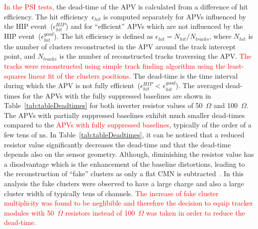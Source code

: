 \textcolor{red}{In the PSI tests,} the dead-time of the APV is calculated from a difference of hit efficiency. The hit efficiency~$\epsilon_{hit}$ is computed separately for APVs influenced by the HIP event~($\epsilon_{hit}^{HIP}$) and for ``efficient'' APVs which are not influenced by the HIP event~($\epsilon_{hit}^{good}$). The hit efficiency is defined as $\epsilon_{hit} = N_{hit}/N_{tracks}$, where $N_{hit}$ is the number of clusters reconstructed in the APV around the track intercept point, and $N_{tracks}$ is the number of reconstructed tracks traversing the APV. \textcolor{red}{The tracks were renonstructed using simple track finding algorithm using the least-squares linear fit of the clusters positions. } The dead-time is the time interval during which the APV is not fully efficient~($\epsilon_{hit}^{HIP}$ < $\epsilon_{hit}^{good}$). The averaged dead-times for the APVs with the fully suppressed baselines are shown in Table~\ref{tab:tableDeadtimes} for both inverter resistor values of 50~$\Omega$ and 100~$\Omega$. The APVs with partially suppressed baselines exhibit much smaller dead-times compared to the \textcolor{red}{APVs with fully suppressed baselines}, typically of the order of a few tens of ns. In Table~\ref{tab:tableDeadtimes}, it can be noticed that a reduced resistor value significantly decreases the dead-time and that the dead-time depends also on the sensor geometry. Although, diminishing the resistor value has a disadvantage which is the enhancement of the baseline distortions, leading to the reconstruction of ``fake'' clusters as only a flat CMN is subtracted~\cite{Bainbridge:2004jc}. In this analysis the fake clusters were observed to have a large charge and also a large cluster width of typically tens of channels. \textcolor{red}{The increase of fake cluster multiplicity was found to be neglibible and therefore the decision to equip tracker modules with 50~$\Omega$ resistors instead of 100~$\Omega$ was taken in order to reduce the dead-time. }  



